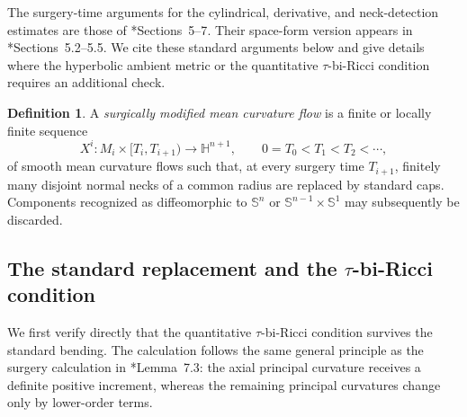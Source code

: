\documentclass[11pt,reqno]{amsart}
\theoremstyle{definition}
\newtheorem{definition}[proposition]{Definition}
\theoremstyle{remark}
\numberwithin{equation}{section}
\newcommand{\Hh}{\mathbb H}
\newcommand{\Sph}{\mathbb S}
\begin{document}
The surgery-time arguments for the cylindrical, derivative, and
neck-detection estimates are those of \cite{HS09}*{Sections~5--7}.  Their
space-form version appears in \cite{LN21}*{Sections~5.2--5.5}.  We cite these
standard arguments below and give details where the hyperbolic ambient metric
or the quantitative $\tau$-bi-Ricci condition requires an additional check.

\begin{definition}
  A \emph{surgically modified mean curvature flow} is a finite or locally
  finite sequence
  \begin{equation*}
  X^i:M_i\times[T_i,T_{i+1})\longrightarrow\Hh^{n+1},
  \qquad
  0=T_0<T_1<T_2<\cdots,
  \end{equation*}
  of smooth mean curvature flows such that, at every surgery time $T_{i+1}$,
  finitely many disjoint normal necks of a common radius are replaced by
  standard caps.  Components recognized as diffeomorphic to $\Sph^n$ or
  $\Sph^{n-1}\times\Sph^1$ may subsequently be discarded.
\end{definition}


\subsection{The standard replacement and the $\tau$-bi-Ricci condition}

We first verify directly that the quantitative $\tau$-bi-Ricci condition
survives the standard bending.  The calculation follows the same general
principle as the surgery calculation in
\cite{BH17}*{Lemma~7.3}: the axial principal curvature receives a definite
positive increment, whereas the remaining principal curvatures change only
by lower-order terms.
\end{document}
